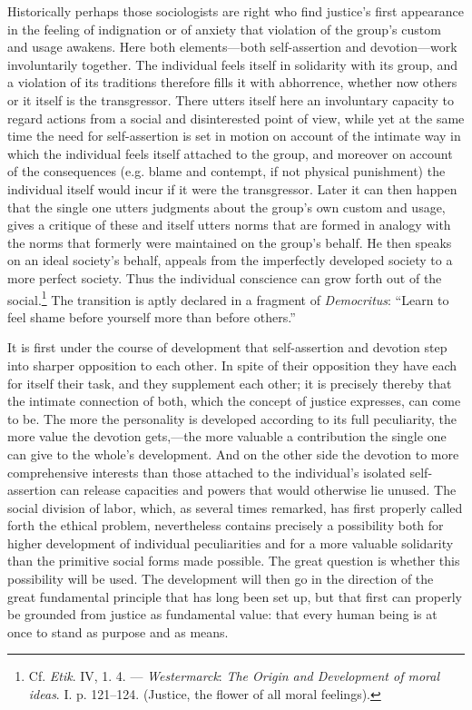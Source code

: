 \documentclass[12pt,a4paper]{book}
\newcommand{\opage}[1]{\marginnote{\footnotesize\textit{[#1]}}}
\begin{document}
Historically perhaps those sociologists are right who find justice's first appearance in the feeling of indignation
or of anxiety that violation of the group's custom and usage awakens. Here both elements---both self-assertion and
devotion---work involuntarily together. The individual feels itself in solidarity with its group, and a violation of
its traditions therefore fills it with abhorrence, whether now others or it itself is the transgressor. There utters
itself here an involuntary capacity to regard actions from a social and disinterested point of view, while yet at
the same time the need for self-assertion is set in motion on account of the intimate way in which the individual
feels itself attached to the group, and moreover on account of the consequences (e.g. blame and contempt, if not
physical punishment) the individual itself would incur if it were the transgressor. Later it can then happen that
the single one utters judgments about the group's own custom and usage, gives a critique of these and itself utters
norms that are formed in analogy with the norms that formerly were maintained on the group's behalf. He then speaks
on an ideal society's behalf, appeals from the imperfectly developed society to a more perfect society. Thus the
\opage{367}individual conscience can grow forth out of the social.\footnote{Cf. \emph{Etik}. IV, 1. 4. --- \emph{Westermarck}:
\emph{The Origin and Development of moral ideas}. I. p. 121--124. (Justice, the flower of all moral feelings).} The
transition is aptly declared in a fragment of \emph{Democritus}: ``Learn to feel shame before yourself more than
before others.''

It is first under the course of development that self-assertion and devotion step into sharper opposition to each
other. In spite of their opposition they have each for itself their task, and they supplement each other; it is
precisely thereby that the intimate connection of both, which the concept of justice expresses, can come to be. The
more the personality is developed according to its full peculiarity, the more value the devotion gets,---the more
valuable a contribution the single one can give to the whole's development. And on the other side the devotion to
more comprehensive interests than those attached to the individual's isolated self-assertion can release capacities
and powers that would otherwise lie unused. The social division of labor, which, as several times remarked, has
first properly called forth the ethical problem, nevertheless contains precisely a possibility both for higher
development of individual peculiarities and for a more valuable solidarity than the primitive social forms made
possible. The great question is whether this possibility will be used. The development will then go in the direction
of the great fundamental principle that has long been set up, but that first can properly be grounded from justice
as fundamental value: that every human being is at once to stand as purpose and as means.
\end{document}
